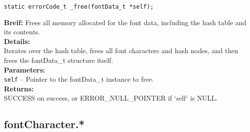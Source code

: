 \begin{verbatim}
static errorCode_t _free(fontData_t *self);
\end{verbatim}
\textbf{Breif:} Frees all memory allocated for the font data, including the hash table and its contents. \\
\textbf{Details:} \\
\hspace*{1cm}Iterates over the hash table, frees all font characters and hash nodes, and then frees the fontData\_t structure itself. \\
\textbf{Parameters:} \\
\hspace*{1cm}\texttt{self} -- Pointer to the fontData\_t instance to free. \\
\textbf{Returns:} \\
\hspace*{1cm}SUCCESS on success, or ERROR\_NULL\_POINTER if `self` is NULL. \\[1em]




\subsection{fontCharacter.*}




